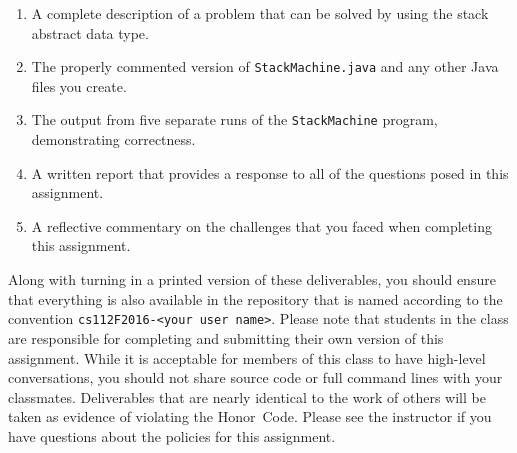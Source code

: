 \begin{enumerate}
  \itemsep0pt

  \item A complete description of a problem that can be solved by using the stack abstract data type.

  \item The properly commented version of {\tt StackMachine.java} and any other Java files you create.

  \item The output from five separate runs of the {\tt StackMachine} program, demonstrating correctness.

  \item A written report that provides a response to all of the questions posed in this assignment.

  \item A reflective commentary on the challenges that you faced when completing this assignment.

\end{enumerate}

Along with turning in a printed version of these deliverables, you should ensure that everything is also available in
the repository that is named according to the convention {\tt cs112F2016-<your user name>}. Please note that students in
the class are responsible for completing and submitting their own version of this assignment. While it is acceptable for
members of this class to have high-level conversations, you should not share source code or full command lines with your
classmates. Deliverables that are nearly identical to the work of others will be taken as evidence of violating the
\mbox{Honor Code}. Please see the instructor if you have questions about the policies for this assignment.


